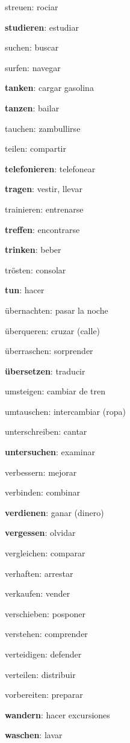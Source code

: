 \begin{multicols}{2}
\begin{myitemize}
\item streuen: rociar
\item \textbf{studieren}: estudiar
\item suchen: buscar
\item surfen: navegar
\item \textbf{tanken}: cargar gasolina
\item \textbf{tanzen}: bailar
\item tauchen: zambullirse
\item teilen: compartir
\item \textbf{telefonieren}: telefonear
\item \textbf{tragen}: vestir, llevar
\item trainieren: entrenarse
\item \textbf{treffen}: encontrarse
\item \textbf{trinken}: beber
\item trösten: consolar
\item \textbf{tun}: hacer
\item übernachten: pasar la noche
\item überqueren: cruzar (calle)
\item überraschen: sorprender
\item \textbf{übersetzen}: traducir
\item umsteigen: cambiar de tren
\item umtauschen: intercambiar (ropa)
\item unterschreiben: cantar
\item \textbf{untersuchen}: examinar
\item verbessern: mejorar
\item verbinden: combinar
\item \textbf{verdienen}: ganar (dinero)
\item \textbf{vergessen}: olvidar
\item vergleichen: comparar
\item verhaften: arrestar
\item verkaufen: vender
\item verschieben: posponer
\item verstehen: comprender
\item verteidigen: defender
\item verteilen: distribuir
\item vorbereiten: preparar
\item \textbf{wandern}: hacer excursiones
\item \textbf{waschen}: lavar

\end{myitemize}
\end{multicols}
